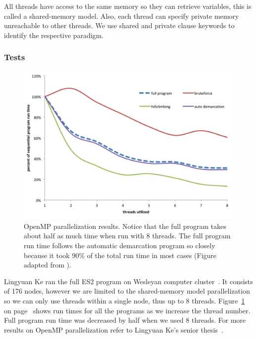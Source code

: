 All threads have access to the same memory so they can retrieve variables, this is called a shared-memory model.
Also, each thread can specify private memory unreachable to other threads.
We use shared and private clause keywords to identify the respective paradigm.

\subsubsection*{Tests}
\begin{figure}[h!]
\centering
\includegraphics[scale=0.6]{images/LingParallelized-CH4}
\caption[OpenMP parallelization results.]{OpenMP parallelization results. Notice that the full program takes about half as much time when run with 8 threads. The full program run time follows the automatic demarcation program so closely because it took 90\% of the total run time in most cases (Figure adapted from \protect\cite{lingThesis}).}
\label{fig:LingParallelized}
\end{figure}

Lingyuan Ke ran the full ES2 program on Wesleyan computer cluster~\cite{lingThesis}.
It consists of 176 nodes, however we are limited to the shared-memory model parallelization so we can only use threads within a single node, thus up to 8 threads.
Figure~\ref{fig:LingParallelized} on page~\pageref{fig:LingParallelized} shows run times for all the programs as we increase the thread number.
Full program run time was decreased by half when we used 8 threads.
For more results on OpenMP parallelization refer to Lingyuan Ke's senior thesis~\cite{lingThesis}.

